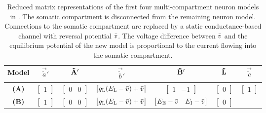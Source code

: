 \begin{table}[p]
	\caption[Reduced matrix representations of the first four neuron models in ]{Reduced matrix representations of the first four multi-compartment neuron models in .
	The somatic compartment is disconnected from the remaining neuron model.
	Connections to the somatic compartment are replaced by a static conductance-based channel with reversal potential ${{\bar v}}$. The voltage difference between ${{\bar v}}$ and the equilibrium potential of the new model is proportional to the current flowing into the somatic compartment.
	}
	\label{tbl:nlif_matrices_reduced}
	\small\sffamily\centering
	\begin{tabular}{c c c c c c c}
		\toprule
		\multicolumn{1}{c}{\textbf{Model}\!\!} & $\vec{\tilde a}'$ & $\mathbf{\tilde A}'$ & $\vec{\tilde b}'$ & $\mathbf{\tilde B}'$ & $\mathbf{\tilde L}$ & $\vec{\tilde c}$\\
		\midrule
			\textbf{(A)}
			& $\displaystyle \begin{bmatrix} 1 \end{bmatrix}$
			& $\displaystyle \begin{bmatrix} 0 & 0 \end{bmatrix}$
			& $\displaystyle \begin{bmatrix} g_\mathrm{L} ( E_\mathrm{L} - {{\bar v}} ) + {{\bar v}} \end{bmatrix}$
			& $\displaystyle \begin{bmatrix} 1 & -1 \end{bmatrix}$
			& $\displaystyle \begin{bmatrix} 0 \end{bmatrix}$
			& $\displaystyle \begin{bmatrix} 1 \end{bmatrix}$\\[0.5cm]
			\textbf{(B)}
			& $\displaystyle \begin{bmatrix} 1 \end{bmatrix}$
			& $\displaystyle \begin{bmatrix} 0 & 0 \end{bmatrix}$
			& $\displaystyle \begin{bmatrix} g_\mathrm{L} ( E_\mathrm{L} - {{\bar v}} ) + {{\bar v}} \end{bmatrix}$
			& $\displaystyle \begin{bmatrix} E_\mathrm{E} - {{\bar v}} & E_\mathrm{I} - {{\bar v}} \end{bmatrix}$
			& $\displaystyle \begin{bmatrix} 0 \end{bmatrix}$

\end{tabular}
\end{table}
